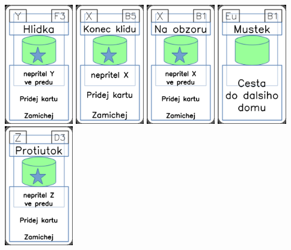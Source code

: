 \documentclass[a4paper]{article}
\begin{document}
	\includegraphics[width=3.0cm]{img-5_27}
	\includegraphics[width=3.0cm]{img-5_9}
	\includegraphics[width=3.0cm]{img-5_5}
	\includegraphics[width=3.0cm]{img-4_35}
	\includegraphics[width=3.0cm]{img-5_47}
\end{document}
